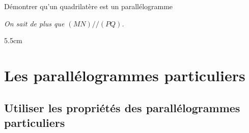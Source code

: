 \documentclass[a4paper]{book}
\begin{document}
\begin{exerciceTitre}{Démontrer qu'un quadrilatère est un parallélogramme}
\begin{minipage}[t]{0.48\textwidth}
            
            \vspace{0.2cm}
            \textit{On sait de plus que $(MN) // (PQ)$.}
            
            \vspace{0.2cm}
            \begin{ZoneReponse}{5.5cm}
            \end{ZoneReponse}
        \end{minipage}
    \end{exerciceTitre}
    
    
    
\section{Les parallélogrammes particuliers}
\subsection{Utiliser les propriétés des parallélogrammes particuliers}
    
\end{document}
